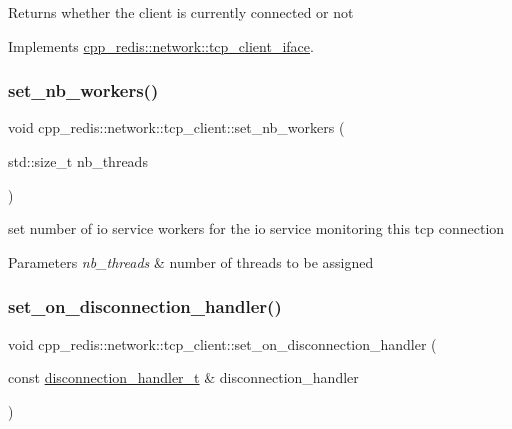 \begin{DoxyReturn}{Returns}
whether the client is currently connected or not 
\end{DoxyReturn}


Implements \hyperlink{classcpp__redis_1_1network_1_1tcp__client__iface_a41ad0b43e3ab172828a3d2ce55d23893}{cpp\+\_\+redis\+::network\+::tcp\+\_\+client\+\_\+iface}.

\mbox{\label{classcpp__redis_1_1network_1_1tcp__client_aa56fc49540d67c5c05b3dda3aaff8a0f}} 
\subsubsection{\texorpdfstring{set\+\_\+nb\+\_\+workers()}{set\_nb\_workers()}}
{\footnotesize\ttfamily void cpp\+\_\+redis\+::network\+::tcp\+\_\+client\+::set\+\_\+nb\+\_\+workers (\begin{DoxyParamCaption}\item[{std\+::size\+\_\+t}]{nb\+\_\+threads }\end{DoxyParamCaption})}

set number of io service workers for the io service monitoring this tcp connection


\begin{DoxyParams}{Parameters}
{\em nb\+\_\+threads} & number of threads to be assigned \\
\hline
\end{DoxyParams}
\mbox{\label{classcpp__redis_1_1network_1_1tcp__client_a24ccdf6dc467aac13cb832a395adb38d}} 
\subsubsection{\texorpdfstring{set\+\_\+on\+\_\+disconnection\+\_\+handler()}{set\_on\_disconnection\_handler()}}
{\footnotesize\ttfamily void cpp\+\_\+redis\+::network\+::tcp\+\_\+client\+::set\+\_\+on\+\_\+disconnection\+\_\+handler (\begin{DoxyParamCaption}\item[{const \hyperlink{classcpp__redis_1_1network_1_1tcp__client__iface_a9a7d5942205db8be03da581a848b8ec0}{disconnection\+\_\+handler\+\_\+t} \&}]{disconnection\+\_\+handler }\end{DoxyParamCaption})\hspace{0.3cm}{\ttfamily [virtual]}}

